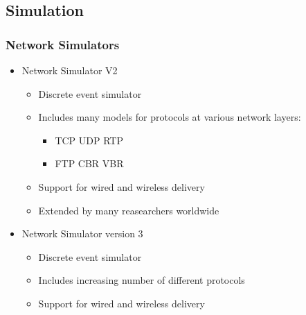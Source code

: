 \documentclass[a4paper]{article}
\begin{document}
	\subsection{Simulation}
	\subsubsection{Network Simulators}
	\begin{itemize}
		\item Network Simulator V2
		\begin{itemize}
			\item Discrete event simulator
			\item Includes many models for protocols at various
				network layers:
			\begin{itemize}
				\item TCP UDP RTP
				\item FTP CBR VBR
			\end{itemize}
		\item Support for wired and wireless delivery
		\item Extended by many reasearchers worldwide
		\end{itemize}
		\item Network Simulator version 3
		\begin{itemize}
			\item Discrete event simulator
			\item Includes increasing number of different protocols
			\item Support for wired and wireless delivery
		\end{itemize}
	\end{itemize}
\end{document}
